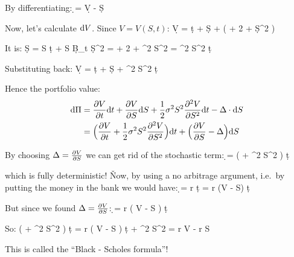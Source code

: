 By differentiating:
\bse
\d \Pi = \d V - \Delta \cdot \d S
\ese

Now, let's calculate $\mathrm{d} V$. Since $V = V(S, t)$:
\bse
\d V =  \d t +  \d S +  \Big(
 + 2  +
 \d S^{2} \Big)
\ese

It is:
\bse
\d S = \mu S \: \d t + \sigma S \: \d B_{t} \imp
\d S^{2} =  + 2  +
\sigma^{2} S^{2}  = \sigma^{2} S^{2} \: \d t
\ese

Substituting back:
\bse
\d V =  \d t +  \d S +  \sigma^{2} S^{2}
 \d t
\ese

Hence the portfolio value:
\begin{align*}
\mathrm{d} \Pi &= \frac{\partial V}{\partial t} \mathrm{d} t + \frac{\partial V}{\partial S} \mathrm{d} S + \frac{1}{2} \sigma^{2} S^{2}
\frac{\partial^{2} V}{\partial S^{2}} \mathrm{d} t - \Delta \cdot \mathrm{d} S \\
&= \Big( \frac{\partial V}{\partial t} + \frac{1}{2} \sigma^{2} S^{2} \frac{\partial^{2} V}{\partial S^{2}} \Big) \mathrm{d} t +
\Big( \frac{\partial V}{\partial S} - \Delta \Big) \mathrm{d} S
\end{align*}

By choosing $\Delta = \frac{\partial V}{\partial S}$ we can get rid of the stochastic term:
\bse
\d \Pi = \Big(  +  \sigma^{2} S^{2}  \Big) \d t
\ese

which is fully deterministic! \v

Now, by using a no arbitrage argument, i.e.\ by putting the money in the bank we would have:
\bse
\d \Pi = r \cdot \Pi \: \d t = r (V - \Delta \cdot S) \: \d t
\ese

But since we found $\Delta = \frac{\partial V}{\partial S}$:
\bse
\d \Pi = r \Big( V -  S \Big) \d t
\ese

So:
\bse
\Big(  +  \sigma^{2} S^{2}  \Big) \d t =
r \Big( V -  S \Big) \d t \imp
{} +  \sigma^{2} S^{2}  =
r V - r S 
\ese

\bse
{}
\ese

This is called the ``Black - Scholes formula''!
